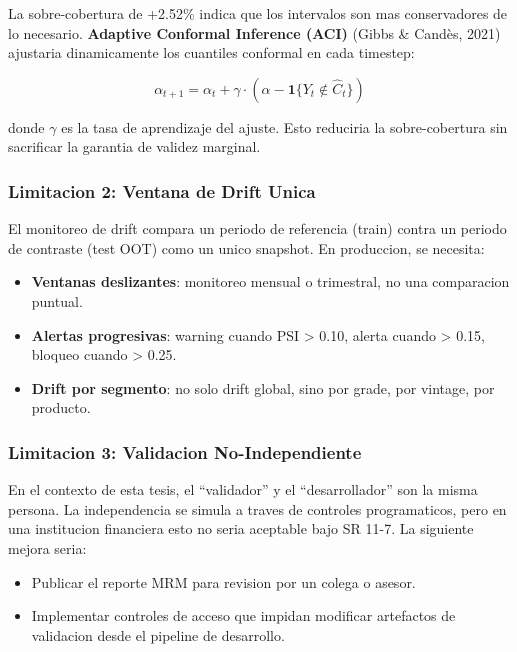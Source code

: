 \documentclass[
  spanish,
  11pt,
  letterpaper,
]{scrbook}
\providecommand{\tightlist}{%
  \setlength{\itemsep}{0pt}\setlength{\parskip}{0pt}}
\theoremstyle{plain}
\theoremstyle{remark}
\begin{document}
La sobre-cobertura de +2.52\% indica que los intervalos son mas
conservadores de lo necesario. \textbf{Adaptive Conformal Inference
(ACI)} (Gibbs \& Candès, 2021) ajustaria dinamicamente los cuantiles
conformal en cada timestep:

\[
\alpha_{t+1} = \alpha_t + \gamma \cdot (\alpha - \mathbf{1}\{Y_t \notin \hat{C}_t\})
\]

donde \(\gamma\) es la tasa de aprendizaje del ajuste. Esto reduciria la
sobre-cobertura sin sacrificar la garantia de validez marginal.

\subsubsection{Limitacion 2: Ventana de Drift
Unica}\label{limitacion-2-ventana-de-drift-unica}

El monitoreo de drift compara un periodo de referencia (train) contra un
periodo de contraste (test OOT) como un unico snapshot. En produccion,
se necesita:

\begin{itemize}
\tightlist
\item
  \textbf{Ventanas deslizantes}: monitoreo mensual o trimestral, no una
  comparacion puntual.
\item
  \textbf{Alertas progresivas}: warning cuando PSI \textgreater{} 0.10,
  alerta cuando \textgreater{} 0.15, bloqueo cuando \textgreater{} 0.25.
\item
  \textbf{Drift por segmento}: no solo drift global, sino por grade, por
  vintage, por producto.
\end{itemize}

\subsubsection{Limitacion 3: Validacion
No-Independiente}\label{limitacion-3-validacion-no-independiente}

En el contexto de esta tesis, el ``validador'' y el ``desarrollador''
son la misma persona. La independencia se simula a traves de controles
programaticos, pero en una institucion financiera esto no seria
aceptable bajo SR 11-7. La siguiente mejora seria:

\begin{itemize}
\tightlist
\item
  Publicar el reporte MRM para revision por un colega o asesor.
\item
  Implementar controles de acceso que impidan modificar artefactos de
  validacion desde el pipeline de desarrollo.
\end{itemize}
\end{document}

